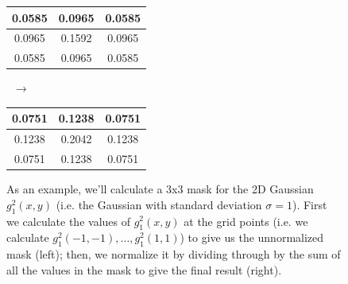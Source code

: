 \begin{figure}[p]
\begin{center}
\begin{tabular}{|c|c|c|}
\hline
0.0585 & 0.0965 & 0.0585 \\
\hline
0.0965 & 0.1592 & 0.0965 \\
\hline
0.0585 & 0.0965 & 0.0585 \\
\hline
\end{tabular}%
$\;\; \longrightarrow \;\;$%
\begin{tabular}{|c|c|c|}
\hline
0.0751 & 0.1238 & 0.0751 \\
\hline
0.1238 & 0.2042 & 0.1238 \\
\hline
0.0751 & 0.1238 & 0.0751 \\
\hline
\end{tabular}
\end{center}
\caption{As an example, we'll calculate a 3x3 mask for the 2D Gaussian $g_1^2(x,y)$ (i.e. the Gaussian with standard deviation $\sigma = 1$). First we calculate the values of $g_1^2(x,y)$ at the grid points (i.e. we calculate $g_1^2(-1,-1), \ldots, g_1^2(1,1)$) to give us the unnormalized mask (left); then, we normalize it by dividing through by the sum of all the values in the mask to give the final result (right).}
\label{fig:segmentation-watershed-gaussianmask}
\end{figure}


